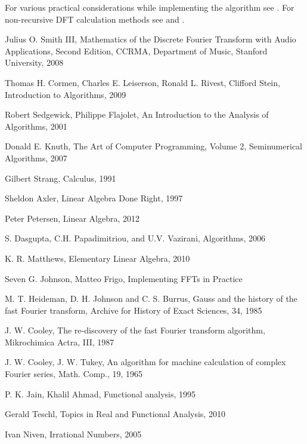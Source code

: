 \documentclass[10pt]{article}
\begin{document}
For various practical considerations while implementing the algorithm see
\cite{Johnson}. For non-recursive DFT calculation methods see \cite{Cormen2009}
and \cite{Papadim2006}. 

\vskip 0.5cm
\centerline{\large \aldineleft}

\begin{thebibliography}{99}

 Julius O. Smith III, Mathematics of the Discrete Fourier
Transform with Audio Applications, Second Edition, CCRMA, Department of Music,
Stanford University, 2008

 Thomas H. Cormen, Charles E. Leiserson, Ronald L. Rivest,
Clifford Stein, Introduction to Algorithms, 2009

 Robert Sedgewick, Philippe Flajolet, An Introduction to
the Analysis of Algorithms, 2001

 Donald E. Knuth, The Art of Computer Programming, Volume 2,
Seminumerical Algorithms, 2007

 Gilbert Strang, Calculus, 1991

 Sheldon Axler, Linear Algebra Done Right, 1997

 Peter Petersen, Linear Algebra, 2012

 S. Dasgupta, C.H. Papadimitriou, and U.V. Vazirani,
Algorithms, 2006

 K. R. Matthews, Elementary Linear Algebra, 2010

 Seven G. Johnson, Matteo Frigo, Implementing FFTs in Practice

 M. T. Heideman, D. H. Johnson and C. S. Burrus, Gauss
and the history of the fast Fourier transform, Archive for History of Exact
Sciences, 34, 1985

 J. W. Cooley, The re-discovery of the fast Fourier
transform algorithm, Mikrochimica Actra, III, 1987

 J. W. Cooley, J. W. Tukey, An algorithm for machine
calculation of complex Fourier series, Math. Comp., 19, 1965

 P. K. Jain, Khalil Ahmad, Functional analysis, 1995

 Gerald Teschl, Topics in Real and Functional Analysis, 2010

 Ivan Niven, Irrational Numbers, 2005

\end{thebibliography}
\end{document}
